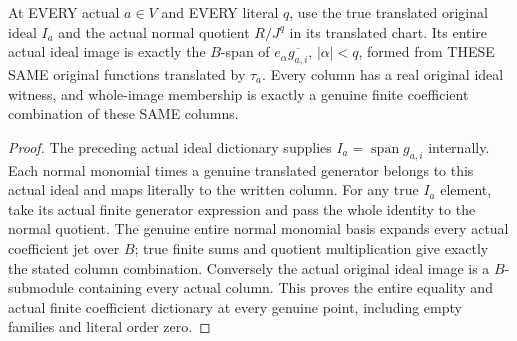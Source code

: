 \begin{theorem}
\label{hir:relative-normal-translated-jets-entire-finite-column-image}
\leanok
{}
At EVERY actual $a\in V$ and EVERY literal $q$, use the true translated
original ideal $I_a$ and the actual normal quotient $R/J^q$ in its translated
chart. Its entire actual ideal image is exactly the $B$-span of
$e_\alpha\overline{g_{a,i}}$, $|\alpha|<q$, formed from THESE SAME original
functions translated by $\tau_a$. Every column has a real original ideal
witness, and whole-image membership is exactly a genuine finite coefficient
combination of these SAME columns.
\end{theorem}
\begin{proof}
The preceding actual ideal dictionary supplies $I_a=\operatorname{span}g_{a,i}$
internally. Each normal monomial times a genuine translated generator belongs
to this actual ideal and maps literally to the written column. For any true
$I_a$ element, take its actual finite generator expression and pass the whole
identity to the normal quotient. The genuine entire normal monomial basis
expands every actual coefficient jet over $B$; true finite sums and quotient
multiplication give exactly the stated column combination. Conversely the
actual original ideal image is a $B$-submodule containing every actual column.
This proves the entire equality and actual finite coefficient dictionary at
every genuine point, including empty families and literal order zero.
\end{proof}

